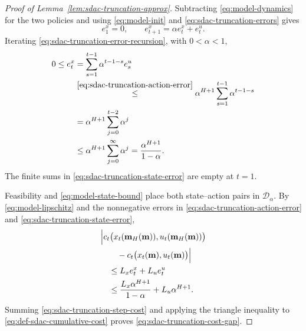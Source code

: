 \documentclass[journal]{IEEEtran}
\theoremstyle{remark}
\begin{document}
\begin{proof}[Proof of Lemma~\ref{lem:sdac-truncation-approx}]
Subtracting \eqref{eq:model-dynamics} for the two policies and using
\eqref{eq:model-init} and \eqref{eq:sdac-truncation-errors} gives
\begin{equation}
\label{eq:sdac-truncation-error-recursion}
e_1^x=0,\qquad e_{t+1}^x=\alpha e_t^x+e_t^u.
\end{equation}
Iterating \eqref{eq:sdac-truncation-error-recursion}, with $0<\alpha<1$,
\begin{equation}
\label{eq:sdac-truncation-state-error}
\begin{aligned}
0\le e_t^x
&=\sum_{s=1}^{t-1}\alpha^{t-1-s}e_s^u\\
&\overset{\eqref{eq:sdac-truncation-action-error}}{\le}
\alpha^{H+1}\sum_{s=1}^{t-1}\alpha^{t-1-s}\\
&=\alpha^{H+1}\sum_{j=0}^{t-2}\alpha^j\\
&\le\alpha^{H+1}\sum_{j=0}^{\infty}\alpha^j
=\frac{\alpha^{H+1}}{1-\alpha}.
\end{aligned}
\end{equation}
The finite sums in \eqref{eq:sdac-truncation-state-error} are empty at $t=1$.

Feasibility and \eqref{eq:model-state-bound} place both state--action pairs
in $\mathcal{D}_\alpha$. By \eqref{eq:model-lipschitz} and the nonnegative
errors in \eqref{eq:sdac-truncation-action-error} and
\eqref{eq:sdac-truncation-state-error},
\begin{equation}
\label{eq:sdac-truncation-step-cost}
\begin{aligned}
&\Bigl|c_t\bigl(x_t(\mathbf{m}_H(\mathbf{m})),
u_t(\mathbf{m}_H(\mathbf{m}))\bigr)\\
&\qquad-c_t\bigl(x_t(\mathbf{m}),u_t(\mathbf{m})\bigr)\Bigr|\\
&\quad\le L_xe_t^x+L_ue_t^u\\
&\quad\le\frac{L_x\alpha^{H+1}}{1-\alpha}+L_u\alpha^{H+1}.
\end{aligned}
\end{equation}
Summing \eqref{eq:sdac-truncation-step-cost} and applying the triangle
inequality to \eqref{eq:def-sdac-cumulative-cost} proves
\eqref{eq:sdac-truncation-cost-gap}.
\end{proof}
\end{document}
